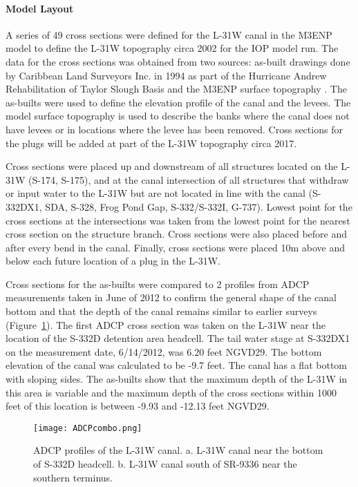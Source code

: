 \paragraph{Model Layout}

A series of 49 cross sections were defined for the L-31W canal in the M3ENP model to define the L-31W topography circa 2002 for the IOP model run.   The data for the cross sections was obtained from two sources: as-built drawings done by Caribbean Land Surveyors Inc. in 1994 as part of the Hurricane Andrew Rehabilitation of Taylor Slough Basis and the M3ENP surface topography \citep{L31Wtopo}.   The as-builts were used to define the elevation profile of the canal and the levees.  The model surface topography is used to describe the banks where the canal does not have levees or in locations where the levee has been removed.  Cross sections for the plugs will be added at part of the L-31W topography circa 2017.

Cross sections were placed up and downstream of all structures located on the L-31W (S-174, S-175), and at the canal intersection of all structures that withdraw or input water to the L-31W but are not located in line with the canal (S-332DX1, SDA, S-328, Frog Pond Gap, S-332/S-332I, G-737).   Lowest point for the cross sections at the intersections was taken from the lowest point for the nearest cross section on the structure branch. Cross sections were also placed before and after every bend in the canal.  Finally, cross sections were placed 10m above and below each future location of a plug in the L-31W.

Cross sections for the as-builts were compared to 2 profiles from ADCP measurements taken in June of 2012 to confirm the general shape of the canal bottom and that the depth of the canal remains similar to earlier surveys (Figure~\ref{fig:ADCPcombo}).  The first ADCP cross section was taken on the L-31W near the location of the S-332D detention area headcell.  The tail water stage at S-332DX1 on the measurement date, 6/14/2012, was 6.20 feet NGVD29.  The bottom elevation of the canal was calculated to be -9.7 feet.  The canal has a flat bottom with sloping sides.  The as-builts show that the maximum depth of the L-31W in this area is variable and the maximum depth of the cross sections within 1000 feet of this location is between -9.93 and -12.13 feet NGVD29.

\begin{figure}[!h]
  \begin{center}
  \texttt{[image: ADCPcombo.png]}
  \caption[ADCP profiles of the L-31W canal. a. L31W canal near the bottom of S-332D headcell. b. L-31W canal south of SR9336 near the southern terminus.]{ADCP profiles of the L-31W canal. a. L-31W canal near the bottom of S-332D headcell. b. L-31W canal south of SR-9336 near the southern terminus.}
  \label{fig:ADCPcombo}
  \end{center}
\end{figure}

